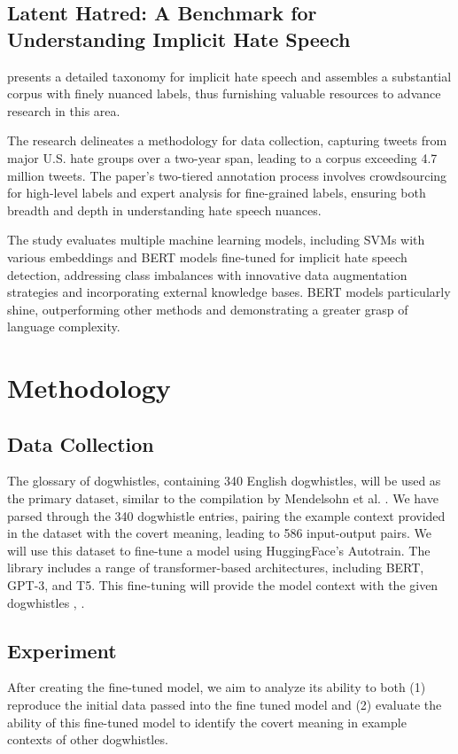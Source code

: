 \documentclass[11pt]{article}
\begin{document}
\subsection{Latent Hatred: A Benchmark for Understanding Implicit Hate Speech}


\cite{elsherief2021latent} presents a detailed taxonomy for implicit hate speech and assembles a substantial corpus with finely nuanced labels, thus furnishing valuable resources to advance research in this area.

The research delineates a methodology for data collection, capturing tweets from major U.S. hate groups over a two-year span, leading to a corpus exceeding 4.7 million tweets. The paper's two-tiered annotation process involves crowdsourcing for high-level labels and expert analysis for fine-grained labels, ensuring both breadth and depth in understanding hate speech nuances.

The study evaluates multiple machine learning models, including SVMs with various embeddings and BERT models fine-tuned for implicit hate speech detection, addressing class imbalances with innovative data augmentation strategies and incorporating external knowledge bases. BERT models particularly shine, outperforming other methods and demonstrating a greater grasp of language complexity. 




\section{Methodology}
\subsection{Data Collection}
The glossary of dogwhistles, containing 340 English dogwhistles, will be used as the primary dataset, similar to the compilation by Mendelsohn et al. \cite{mendelsohn2023dogwhistles}. We have parsed through the 340 dogwhistle entries, pairing the example context provided in the dataset with the covert meaning, leading to 586 input-output pairs. We will use this dataset to fine-tune a model using HuggingFace's Autotrain. The library includes a range of transformer-based architectures, including BERT, GPT-3, and T5. This fine-tuning will provide the model context with the given dogwhistles \cite{hertzberg2022distributional}, \cite{defersha2021detection}.



\subsection{Experiment}
After creating the fine-tuned model, we aim to analyze its ability to both (1) reproduce the initial data passed into the fine tuned model and (2) evaluate the ability of this fine-tuned model to identify the covert meaning in example contexts of other dogwhistles.
\end{document}
